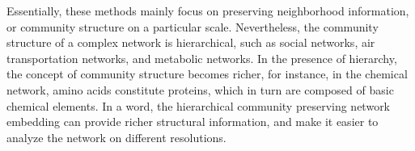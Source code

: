 \documentclass{article}
\theoremstyle{definition}
\newcommand{\origin}[1]{{\color{blue}{#1}}}
\begin{document}
		Essentially, these methods mainly focus on preserving neighborhood information, or community structure on a particular scale. 
		Nevertheless, the community structure of a complex network is hierarchical\cite{clauset2006structural}, such as social networks, air transportation networks, and metabolic networks. 
		In the presence of hierarchy, the concept of community structure becomes richer\cite{sales-pardo2007extracting}, for instance, in the chemical network, amino acids constitute proteins, which in turn are composed of basic chemical elements. 
		In a word, the hierarchical community preserving network embedding can provide richer structural information, and make it easier to analyze the network on different resolutions.

		


		
\end{document}
